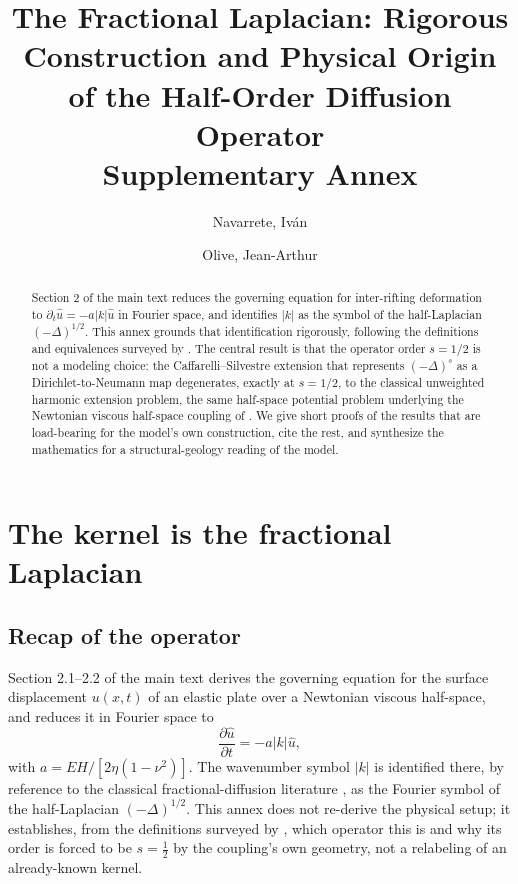 \documentclass{article}
\title{The Fractional Laplacian: Rigorous Construction and Physical Origin\\
  of the Half-Order Diffusion Operator\\
  \large Supplementary Annex}
\author{Navarrete, Iv\'an \and Olive, Jean-Arthur}
\begin{document}
\maketitle

\begin{abstract}
Section 2 of the main text reduces the governing equation for inter-rifting
deformation to $\partial_t\hat u = -a|k|\hat u$ in Fourier space, and
identifies $|k|$ as the symbol of the half-Laplacian $(-\Delta)^{1/2}$. This
annex grounds that identification rigorously, following the definitions and
equivalences surveyed by \citet{daoud2022fractional}. The central result is
that the operator order $s=1/2$ is not a modeling choice: the
Caffarelli--Silvestre extension \citep{caffarelli2007extension} that
represents $(-\Delta)^s$ as a Dirichlet-to-Neumann map degenerates, exactly
at $s=1/2$, to the classical unweighted harmonic extension problem, the same
half-space potential problem underlying the Newtonian viscous half-space
coupling of \citet{savage1978asthenosphere}. We give short proofs of the
results that are load-bearing for the model's own construction, cite the
rest, and synthesize the mathematics for a structural-geology reading of
the model.
\end{abstract}

\tableofcontents

\section{The kernel is the fractional Laplacian}
\label{sec:kernel}

\subsection{Recap of the operator}

Section 2.1--2.2 of the main text derives the governing equation for the
surface displacement $u(x,t)$ of an elastic plate over a Newtonian viscous
half-space, and reduces it in Fourier space to
\begin{equation}
\frac{\partial\hat u}{\partial t} = -a|k|\hat u,
\label{frac:governing}
\end{equation}
with $a = EH/[2\eta(1-\nu^2)]$. The wavenumber symbol $|k|$ is identified
there, by reference to the classical fractional-diffusion literature
\citep{metzler2000random,samko1993fractional}, as the Fourier symbol of the
half-Laplacian $(-\Delta)^{1/2}$. This annex does not re-derive the physical
setup; it establishes, from the definitions surveyed by
\citet{daoud2022fractional}, which operator this is and why its
order is forced to be $s=\tfrac12$ by the coupling's own geometry,
not a relabeling of an already-known kernel.
\end{document}
